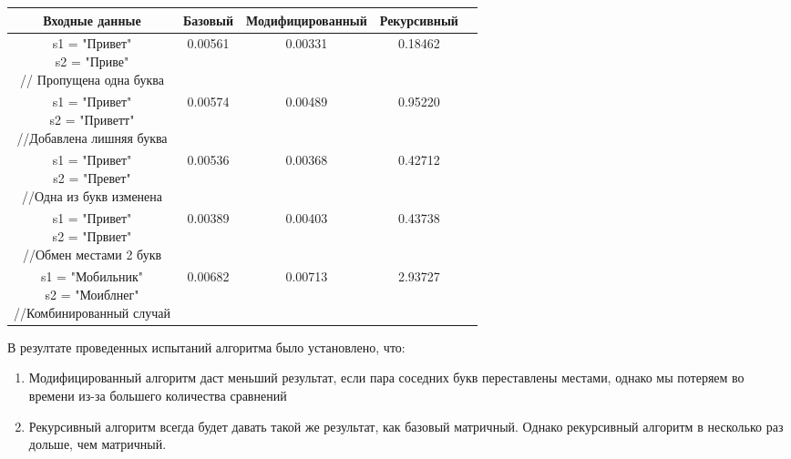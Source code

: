 	
	\begin{center}
		\begin{tabular}{|c|c|c|c|c|}
			\hline
			Входные данные & Базовый & Модифицированный & Рекурсивный\\
			
			\hline
			\makecell{s1 = "Привет" \\ s2 = "Приве" \\ // Пропущена одна буква} &
			0.00561 & 0.00331 & 0.18462\\
			
			\hline
			\makecell{s1 = "Привет" \\ s2 = "Приветт" \\ //Добавлена лишняя буква} &
			0.00574 & 0.00489 & 0.95220\\
			
			\hline
			\makecell{s1 = "Привет" \\ s2 = "Превет" \\ //Одна из букв изменена} &
			0.00536 & 0.00368 & 0.42712\\
			
			\hline
			\makecell{s1 = "Привет" \\ s2 = "Првиет" \\ //Обмен местами 2 букв} &
			0.00389 & 0.00403 & 0.43738\\
			
			\hline
			\makecell{s1 = "Мобильник" \\ s2 = "Моиблнег" \\ //Комбинированный случай} &
			0.00682 & 0.00713 & 2.93727\\
			
			\hline	
		\end{tabular}
	\end{center}	
	
		
	
	
	
	\newpage
	
	
	В резултате проведенных испытаний алгоритма было установлено, что:
	\begin{enumerate}
		\item Модифицированный алгоритм даст меньший результат, если пара соседних букв переставлены местами, однако мы потеряем во времени из-за большего количества сравнений
		\item Рекурсивный алгоритм всегда будет давать такой же результат, как базовый матричный. Однако рекурсивный алгоритм в несколько раз дольше, чем матричный.
	\end{enumerate}
	
